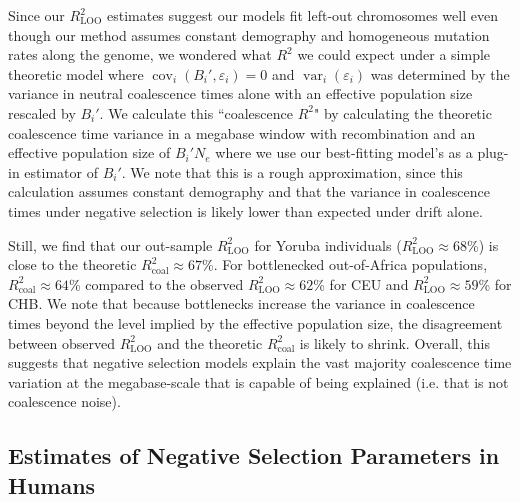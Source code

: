 \documentclass[11pt]{article}
\DeclareMathOperator{\var}{var}
\DeclareMathOperator{\cov}{cov}
\begin{document}
Since our $R_\text{LOO}^2$ estimates suggest our models fit left-out
chromosomes well even though our method assumes constant demography and
homogeneous mutation rates along the genome, we wondered what $R^2$ we could
expect under a simple theoretic model where $\cov_i(B_i', \varepsilon_i) = 0$
and $\var_i(\varepsilon_i)$ was determined by the variance in neutral
coalescence times alone with an effective population size rescaled by $B_i'$.
We calculate this ``coalescence $R^2$" by calculating the theoretic coalescence
time variance in a megabase window with recombination and an effective
population size of $B_i' N_e$ where we use our best-fitting model's as a
plug-in estimator of $B_i'$. We note that this is a rough approximation, since
this calculation assumes constant demography and that the variance in
coalescence times under negative selection is likely lower than expected under
drift alone. 

Still, we find that our out-sample $R_\text{LOO}^2$ for Yoruba individuals
($R_\text{LOO}^2 \approx 68$\%) is close to the theoretic $R_\text{coal}^2
\approx 67$\%. For bottlenecked out-of-Africa populations, $R_\text{coal}^2
\approx 64$\% compared to the observed $R_\text{LOO}^2 \approx 62$\% for CEU
and $R_\text{LOO}^2 \approx 59$\% for CHB. We note that because bottlenecks
increase the variance in coalescence times beyond the level implied by the
effective population size, the disagreement between observed $R_\text{LOO}^2$
and the theoretic $R_\text{coal}^2$ is likely to shrink. Overall, this suggests
that negative selection models explain the vast majority coalescence time
variation at the megabase-scale that is capable of being explained (i.e. that
is not coalescence noise).

\subsection*{Estimates of Negative Selection Parameters in Humans}
\end{document}
